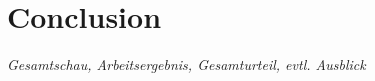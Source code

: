 \chapter{Conclusion}
\label{cha:Conclusion}
\textit{Gesamtschau, Arbeitsergebnis, Gesamturteil, evtl. Ausblick}